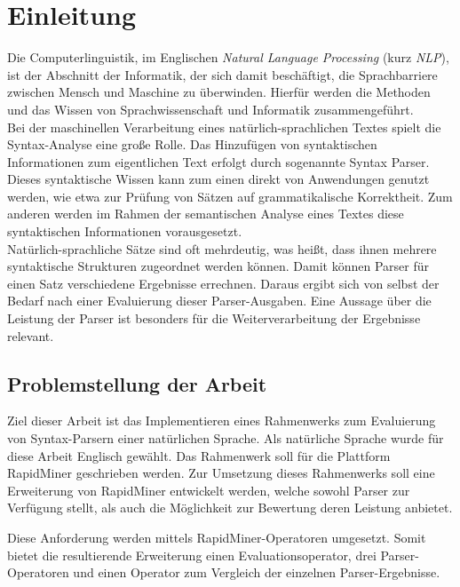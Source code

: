 %
\chapter{Einleitung}
\label{sec:intro}

Die Computerlinguistik, im Englischen \textit{Natural Language Processing} (kurz \textit{NLP}), ist der Abschnitt der Informatik, der sich damit beschäftigt, die Sprachbarriere zwischen Mensch und Maschine zu überwinden. Hierfür werden die Methoden und das Wissen von Sprachwissenschaft und Informatik zusammengeführt. \\
Bei der maschinellen Verarbeitung eines natürlich-sprachlichen Textes spielt die Syntax-Analyse eine große Rolle. Das Hinzufügen von syntaktischen Informationen zum eigentlichen Text erfolgt durch sogenannte Syntax Parser. Dieses syntaktische Wissen kann zum einen direkt von Anwendungen genutzt werden, wie etwa zur Prüfung von Sätzen auf grammatikalische Korrektheit. Zum anderen werden im Rahmen der semantischen Analyse eines Textes diese syntaktischen Informationen vorausgesetzt.\\
Natürlich-sprachliche Sätze sind oft mehrdeutig, was heißt, dass ihnen mehrere syntaktische Strukturen zugeordnet werden können. Damit können Parser für einen Satz verschiedene Ergebnisse errechnen. Daraus ergibt sich von selbst der Bedarf nach einer Evaluierung dieser Parser-Ausgaben. Eine Aussage über die Leistung der Parser ist besonders für die Weiterverarbeitung der Ergebnisse relevant. \cite{cl}

\section{Problemstellung der Arbeit}

Ziel dieser Arbeit ist das Implementieren eines Rahmenwerks zum Evaluierung von Syntax-Parsern einer natürlichen Sprache. Als natürliche Sprache wurde für diese Arbeit Englisch gewählt. Das Rahmenwerk soll für die Plattform RapidMiner \cite{rmstudio} geschrieben werden. Zur Umsetzung dieses Rahmenwerks soll eine Erweiterung von RapidMiner entwickelt werden, welche sowohl Parser zur Verfügung stellt, als auch die Möglichkeit zur Bewertung deren Leistung anbietet. 

Diese Anforderung werden mittels RapidMiner-Operatoren umgesetzt. Somit bietet die resultierende Erweiterung einen Evaluationsoperator, drei Parser-Operatoren und einen Operator zum Vergleich der einzelnen Parser-Ergebnisse.


